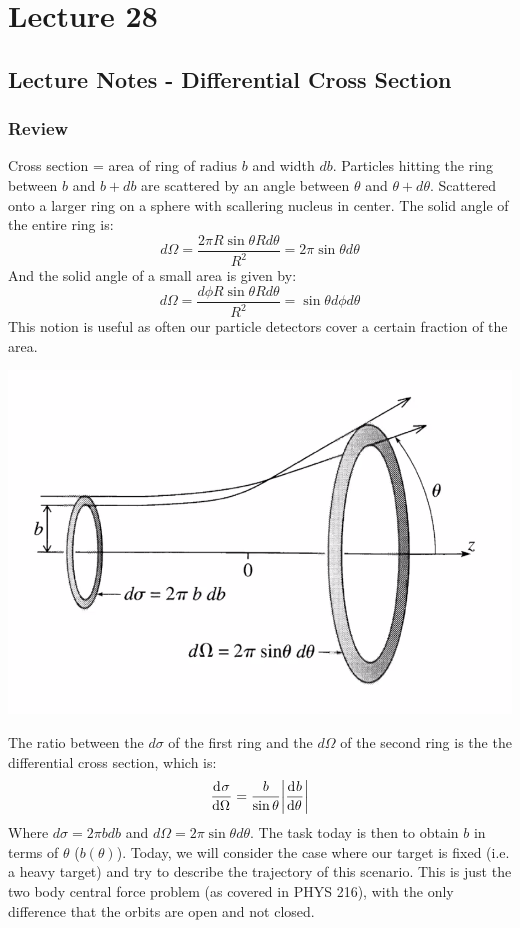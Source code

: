 \documentclass[../PHYS306Notes.tex]{subfiles}
\begin{document}
\section{Lecture 28}
\subsection{Lecture Notes - Differential Cross Section}
\subsubsection{Review}
Cross section = area of ring of radius $b$ and width $db$. Particles hitting the ring between $b$ and $b + db$ are scattered by an angle between $\theta$ and $\theta + d\theta$. Scattered onto a larger ring on a sphere with scallering nucleus in center. The solid angle of the entire ring is:
\[d\Omega = \frac{2\pi R\sin\theta Rd\theta}{R^2} = 2\pi\sin\theta d\theta\]
And the solid angle of a small area is given by:
\[d\Omega = \frac{d\phi R\sin\theta Rd\theta}{R^2} = \sin\theta d\phi d\theta\]
This notion is useful as often our particle detectors cover a certain fraction of the area. 
\begin{center}
    \includegraphics[scale=0.5]{Lecture-28/l28-img1.png}
\end{center}
The ratio between the $d\sigma$ of the first ring and the $d\Omega$ of the second ring is the the differential cross section, which is:
\[\dod{\sigma}{\Omega} = \frac{b}{\sin\theta}\abs{\dod{b}{\theta}}\]
Where $d\sigma = 2\pi b db$ and $d\Omega = 2\pi \sin\theta d\theta$. The task today is then to obtain $b$ in terms of $\theta$ ($b(\theta)$). Today, we will consider the case where our target is fixed (i.e. a heavy target) and try to describe the trajectory of this scenario. This is just the two body central force problem (as covered in PHYS 216), with the only difference that the orbits are open and not closed.
\end{document}
